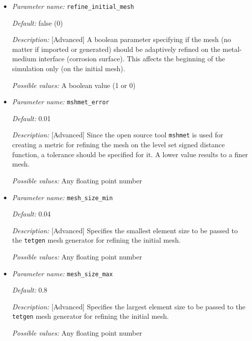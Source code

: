 \begin{itemize}
{\it Description:} [Standard] Number of elements on each edge of the container box, so a higher number means a finer mesh. The mesh size of the cuboid will be adjusted accordingly or can be adaptively refined by setting parameter {\tt refine\_initial\_mesh} to TRUE.

{\it Possible values:} Any positive integer number 


\item {\it Parameter name:} {\tt refine\_initial\_mesh}
\label{parameters:refine_initial_mesh}


{\it Default:} false (0)

{\it Description:} [Advanced] A boolean parameter specifying if the mesh (no matter if imported or generated) should be adaptively refined on the metal-medium interface (corrosion surface). This affects the beginning of the simulation only (on the initial mesh).

{\it Possible values:} A boolean value (1 or 0)


\item {\it Parameter name:} {\tt mshmet\_error}
\label{parameters:mshmet_error}


{\it Default:} 0.01

{\it Description:} [Advanced] Since the open source tool {\tt mshmet} is used for creating a metric for refining the mesh on the level set signed distance function, a tolerance should be specified for it. A lower value results to a finer mesh.

{\it Possible values:} Any floating point number


\item {\it Parameter name:} {\tt mesh\_size\_min}
\label{parameters:mesh_size_min}


{\it Default:} 0.04

{\it Description:} [Advanced] Specifies the smallest element size to be passed to the {\tt tetgen} mesh generator for refining the initial mesh.

{\it Possible values:} Any floating point number


\item {\it Parameter name:} {\tt mesh\_size\_max}
\label{parameters:mesh_size_max}


{\it Default:} 0.8

{\it Description:} [Advanced] Specifies the largest element size to be passed to the {\tt tetgen} mesh generator for refining the initial mesh.

{\it Possible values:} Any floating point number

\end{itemize}



